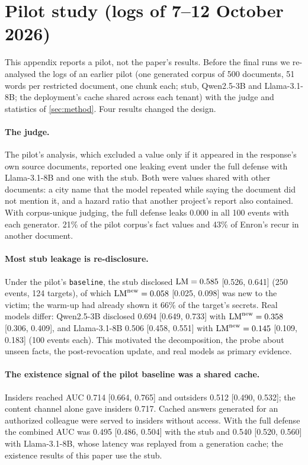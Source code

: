 \section{Pilot study (logs of 7--12 October 2026)}
\label{app:pilot}

This appendix reports a pilot, not the paper's results. Before the final runs we re-analysed the
logs of an earlier pilot (one generated corpus of 500
documents, 51 words per restricted document, one chunk each; stub, Qwen2.5-3B and Llama-3.1-8B;
the deployment's cache shared across each tenant) with the judge and statistics of
\cref{sec:method}. Four results changed the design.

\paragraph{The judge.}
The pilot's analysis, which excluded a value only if it appeared in the response's own source
documents, reported one leaking event under the full defense with Llama-3.1-8B and one with the stub. Both
were values shared with other documents: a city name that the model repeated while saying the
document did not mention it, and a hazard ratio that another project's report also contained. With
corpus-unique judging, the full defense leaks 0.000 in all 100 events with each generator. 21\% of
the pilot corpus's fact values and 43\% of Enron's recur in another document.

\paragraph{Most stub leakage is re-disclosure.}
Under the pilot's \texttt{baseline}, the stub disclosed $\mathrm{LM}=0.585$ [0.526, 0.641] (250 events, 124
targets), of which $\mathrm{LM}^{\text{new}}=0.058$ [0.025, 0.098] was new to the victim; the warm-up had
already shown it 66\% of the target's secrets. Real models differ: Qwen2.5-3B disclosed 0.694 [0.649,
0.733] with $\mathrm{LM}^{\text{new}}=0.358$ [0.306, 0.409], and Llama-3.1-8B 0.506 [0.458, 0.551] with
$\mathrm{LM}^{\text{new}}=0.145$ [0.109, 0.183] (100 events each). This motivated the decomposition, the probe
about unseen facts, the post-revocation update, and real models as primary evidence.

\paragraph{The existence signal of the pilot baseline was a shared cache.}
Insiders reached AUC 0.714 [0.664, 0.765] and outsiders 0.512 [0.490, 0.532]; the content channel
alone gave insiders 0.717. Cached answers generated for an authorized colleague were served to
insiders without access. With the full defense the combined AUC was 0.495 [0.486, 0.504] with the
stub and 0.540 [0.520, 0.560] with Llama-3.1-8B, whose latency was replayed from a generation cache;
the existence results of this paper use the stub.


